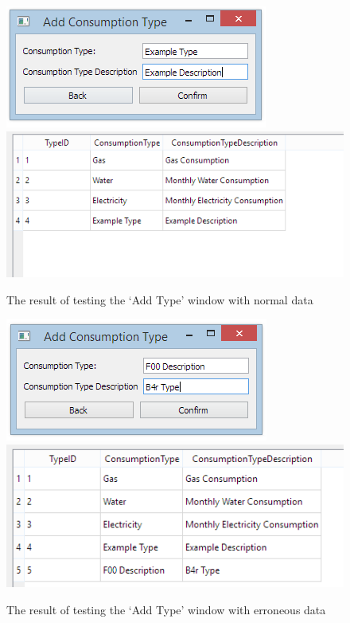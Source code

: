 \begin{figure}[H]
	\includegraphics{./testing/images/test_4_1_add_type_data.png}
	\includegraphics{./testing/images/test_4_1_add_type_added.png}
	\caption{The result of testing the `Add Type' window with normal data} \label{fig:test_4.1_result}
\end{figure}

\begin{figure}[H]
	\includegraphics{./testing/images/test_4_2_add_type_data_erroneous.png}
	\includegraphics{./testing/images/test_4_2_add_type_erroneous_added.png}
	\caption{The result of testing the `Add Type' window with erroneous data} \label{fig:test_4.2_result}
\end{figure}

